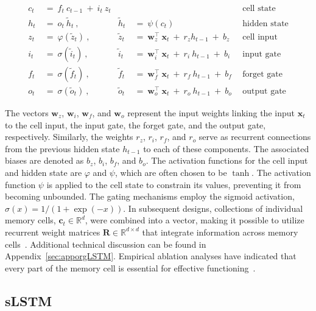 \begin{align}
c_t \ &= \  f_t \ c_{t-1} \ + \ i_t \ z_t &  & &\text{cell state} \\
h_t  \ &= \ o_t \ \tilde{h}_t \ , & \tilde{h}_t \ &= \ \psi \left( c_t\right)
  &\text{hidden state} \\
z_t \ &= \ \varphi \left( \tilde{z}_t \right) \ , 
  &\tilde{z}_t \ &=  \ \mathbf{w}^\top_{z} \ \mathbf{x}_t \ + \
  r_{z}  h_{t-1} \ + \  b_{z} \ \
  &\text{cell input} \\
i_t \ &= \ \sigma \left( \tilde{i}_t  \right) \ , 
  &\tilde{i}_t \ &= \ \mathbf{w}^\top_{i} \ \mathbf{x}_t \ + \
  r_{i}  \ h_{t-1} \ + \  b_{i} \ \
  &\text{input gate} \\
f_t \ &= \ \sigma \left(  \tilde{f}_t \right) \ , 
  &\tilde{f}_t \ &= \ \mathbf{w}^\top_{f} \ \mathbf{x}_t  \ + \
  r_{f}  \ h_{t-1} \ + \  b_{f} \ \
  &\text{forget gate} \\
o_t \ &= \ \sigma \left( \tilde{o}_t \right) \ , 
  &\tilde{o}_t  \ &= \ \mathbf{w}^\top_{o} \ \mathbf{x}_t \ + \
  r_{o}  \ h_{t-1} \ + \  b_{o} \ \
  &\text{output gate} 
\end{align}

The vectors $\mathbf{w}_{z}$, $\mathbf{w}_{i}$, $\mathbf{w}_{f}$, and $\mathbf{w}_{o}$ represent the input weights linking the input $\mathbf{x}_t$ to the cell input, the input gate, the forget gate, and the output gate, respectively. Similarly, the weights $r_{z}$, $r_{i}$, $r_{f}$, and $r_{o}$ serve as recurrent connections from the previous hidden state $h_{t-1}$ to each of these components. The associated biases are denoted as $b_{z}$, $b_{i}$, $b_{f}$, and $b_{o}$. The activation functions for the cell input and hidden state are $\varphi$ and $\psi$, which are often chosen to be $\tanh$. The activation function $\psi$ is applied to the cell state to constrain its values, preventing it from becoming unbounded. The gating mechanisms employ the sigmoid activation, $\sigma \left( x \right)= 1/(1+\exp(-x))$. In subsequent designs, collections of individual memory cells, $\mathbf{c}_t \in \mathbb{R}^{d}$, were combined into a vector, making it possible to utilize recurrent weight matrices $\mathbf{R} \in \mathbb{R}^{d \times d}$ that integrate information across memory cells~\citep{Greff:15}. Additional technical discussion can be found in Appendix~\ref{sec:apporgLSTM}. Empirical ablation analyses have indicated that every part of the memory cell is essential for effective functioning~\citep{Greff:15}.

\subsection{sLSTM}
\label{sec:sLSTM}

